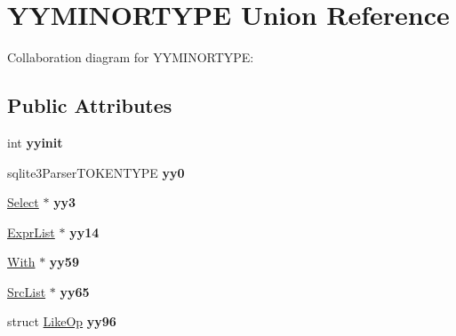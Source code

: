 \hypertarget{union_y_y_m_i_n_o_r_t_y_p_e}{\section{Y\+Y\+M\+I\+N\+O\+R\+T\+Y\+P\+E Union Reference}
\label{union_y_y_m_i_n_o_r_t_y_p_e}
}


Collaboration diagram for Y\+Y\+M\+I\+N\+O\+R\+T\+Y\+P\+E\+:
\subsection*{Public Attributes}
\begin{DoxyCompactItemize}
\item 
\hypertarget{union_y_y_m_i_n_o_r_t_y_p_e_a6cec97309f473b42b70a9738d7cbd5ba}{int {\bfseries yyinit}}\label{union_y_y_m_i_n_o_r_t_y_p_e_a6cec97309f473b42b70a9738d7cbd5ba}

\item 
\hypertarget{union_y_y_m_i_n_o_r_t_y_p_e_a827d6a1bc7ac8df062b3f419db3f50ac}{sqlite3\+Parser\+T\+O\+K\+E\+N\+T\+Y\+P\+E {\bfseries yy0}}\label{union_y_y_m_i_n_o_r_t_y_p_e_a827d6a1bc7ac8df062b3f419db3f50ac}

\item 
\hypertarget{union_y_y_m_i_n_o_r_t_y_p_e_aca8ae9c9c3bc54d7fc7d19319a83b5cc}{\hyperlink{struct_select}{Select} $\ast$ {\bfseries yy3}}\label{union_y_y_m_i_n_o_r_t_y_p_e_aca8ae9c9c3bc54d7fc7d19319a83b5cc}

\item 
\hypertarget{union_y_y_m_i_n_o_r_t_y_p_e_ae57da849c84c97aa260952ec707b188f}{\hyperlink{struct_expr_list}{Expr\+List} $\ast$ {\bfseries yy14}}\label{union_y_y_m_i_n_o_r_t_y_p_e_ae57da849c84c97aa260952ec707b188f}

\item 
\hypertarget{union_y_y_m_i_n_o_r_t_y_p_e_aaff2f1735eb4ea513eacf893d29961bd}{\hyperlink{struct_with}{With} $\ast$ {\bfseries yy59}}\label{union_y_y_m_i_n_o_r_t_y_p_e_aaff2f1735eb4ea513eacf893d29961bd}

\item 
\hypertarget{union_y_y_m_i_n_o_r_t_y_p_e_a22d01a8b2caaffce8f6470b44b087844}{\hyperlink{struct_src_list}{Src\+List} $\ast$ {\bfseries yy65}}\label{union_y_y_m_i_n_o_r_t_y_p_e_a22d01a8b2caaffce8f6470b44b087844}

\item 
\hypertarget{union_y_y_m_i_n_o_r_t_y_p_e_aefee6f3117d38631cf1e6cb739ee626b}{struct \hyperlink{struct_like_op}{Like\+Op} {\bfseries yy96}}\label{union_y_y_m_i_n_o_r_t_y_p_e_aefee6f3117d38631cf1e6cb739ee626b}


\end{DoxyCompactItemize}
